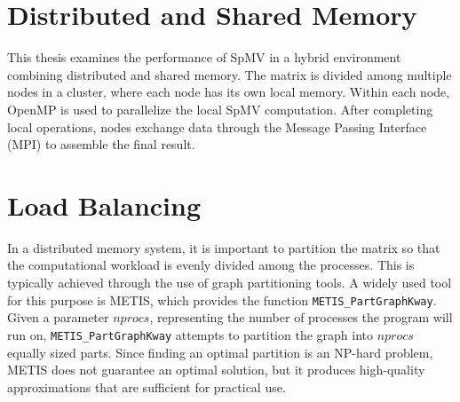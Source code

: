 


\section{Distributed and Shared Memory}
This thesis examines the performance of SpMV in a hybrid environment combining distributed and shared memory. The matrix is divided among multiple nodes in a cluster, where each node has its own local memory. Within each node, OpenMP is used to parallelize the local SpMV computation. After completing local operations, nodes exchange data through the Message Passing Interface (MPI) to assemble the final result. 

\section{Load Balancing}
In a distributed memory system, it is important to partition the matrix so that the computational workload is evenly divided among the processes. This is typically achieved through the use of graph partitioning tools. A widely used tool for this purpose is METIS, which provides the function \texttt{METIS\_PartGraphKway}. Given a parameter \(nprocs\), representing the number of processes the program will run on, \texttt{METIS\_PartGraphKway} attempts to partition the graph into \(nprocs\) equally sized parts. Since finding an optimal partition is an NP-hard problem, METIS does not guarantee an optimal solution, but it produces high-quality approximations that are sufficient for practical use.


